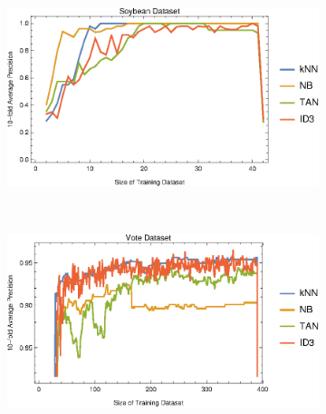 \documentclass{article}
\begin{document}
\begin{figure}[h]
\begin{subfigure}[b]{0.49\textwidth}
			\end{subfigure} \	
			\begin{subfigure}[b]{0.49\textwidth}
				\centering
				\includegraphics[width=\textwidth]{figs//plot_conv_soybean}					
			\end{subfigure} \	
			\begin{subfigure}[b]{0.49\textwidth}
				\centering
				\includegraphics[width=\textwidth]{figs/plot_conv_vote}					
			\end{subfigure}
			\caption{}
			\label{conv_plot}
		\end{figure}
\end{document}
